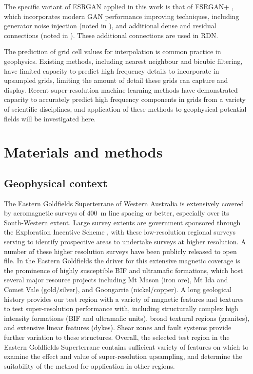 The specific variant of ESRGAN applied in this work is that of ESRGAN+ \parencite{rakotonirinaESRGANFurtherImproving2020}, which incorporates modern GAN performance improving techniques, including generator noise injection (noted in ), and additional dense and residual connections (noted in ).
These additional connections are used in RDN\textdaggerdbl{}.

The prediction of grid cell values for interpolation is common practice in geophysics.
Existing methods, including nearest neighbour and bicubic filtering, have limited capacity to predict high frequency details to incorporate in upsampled grids, limiting the amount of detail these grids can capture and display.
Recent super-resolution machine learning methods have demonstrated capacity to accurately predict high frequency components in grids from a variety of scientific disciplines, and application of these methods to geophysical potential fields will be investigated here.

\section{Materials and methods}
\subsection{Geophysical context}
The Eastern Goldfields Superterrane of Western Australia is extensively covered by aeromagnetic surveys of \qty{400}{\metre} line spacing or better, especially over its South-Western extent.
Large survey extents are government sponsored through the Exploration Incentive Scheme \parencite[e.g.][]{griffinStimulatingGreenfieldsExploration2010}, with these low-resolution regional surveys serving to identify prospective areas to undertake surveys at higher resolution.
A number of these higher resolution surveys have been publicly released to open file.
In the Eastern Goldfields the driver for this extensive magnetic coverage is the prominence of highly susceptible BIF and ultramafic formations, which host several major resource projects including Mt Mason (iron ore), Mt Ida and Comet Vale (gold/silver), and Goongarrie (nickel/copper).
A long geological history provides our test region with a variety of magnetic features and textures to test super-resolution performance with, including structurally complex high intensity formations (BIF and ultramafic units), broad textural regions (granites), and extensive linear features (dykes).
Shear zones and fault systems provide further variation to these structures.
Overall, the selected test region in the Eastern Goldfields Superterrane contains sufficient variety of features on which to examine the effect and value of super-resolution upsampling, and determine the suitability of the method for application in other regions.

